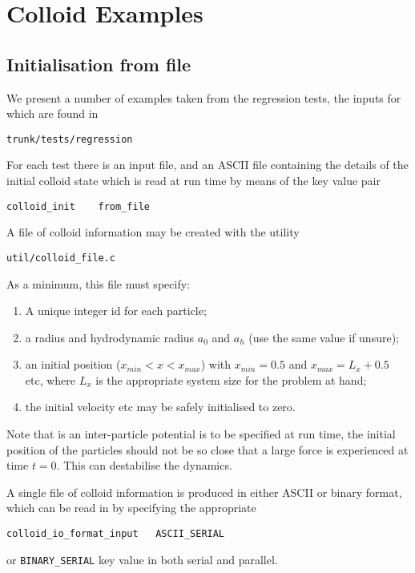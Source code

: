 %
%

\section{Colloid Examples}


\subsection{Initialisation from file}

We present a number of examples taken from the regression tests, the inputs
for which are found in
\begin{verbatim}
trunk/tests/regression
\end{verbatim}
For each test there is an input file, and an ASCII file containing the
details of the initial colloid state which is read at run time by means
of the key value pair
\begin{verbatim}
colloid_init    from_file
\end{verbatim}

A file of colloid information may be created with the utility
\begin{verbatim}
util/colloid_file.c
\end{verbatim}
As a minimum, this file must specify:
\begin{enumerate}
\item
A unique integer id for each particle;
\item
a radius and hydrodynamic radius $a_0$ and $a_h$ (use the same value
if unsure);
\item
an initial position ($x_{min} < x < x_{max}$) with $x_{min} = 0.5$
and $x_{max} = L_x + 0.5$ etc, where $L_x$ is the appropriate system
size for the problem at hand;
\item
the initial velocity etc may be safely initialised to zero.
\end{enumerate}
Note that is an inter-particle potential is to be specified at run time,
the initial position of the particles should not be so close that a
large force is experienced at time $t=0$. This can destabilise the
dynamics.

A single file of colloid information is produced in either ASCII or binary
format, which can be read in by specifying the appropriate
\begin{verbatim}
colloid_io_format_input   ASCII_SERIAL
\end{verbatim}
or \texttt{BINARY\_SERIAL} key value in both serial and parallel.


